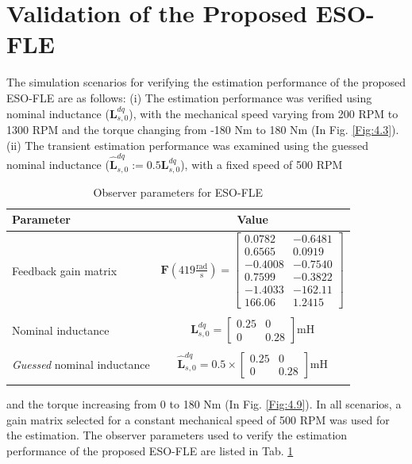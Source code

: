 \section{Validation of the Proposed ESO-FLE}
The simulation scenarios for verifying the estimation performance of the proposed ESO-FLE are as follows: (i) The estimation performance was verified using nominal inductance ($\mathbf{L}^{dq}_{s,0}$), with the mechanical speed varying from 200 RPM to 1300 RPM and the torque changing from -180 Nm to 180 Nm (In Fig. \ref{Fig:4.3}). (ii) The transient estimation performance was examined using the guessed nominal inductance ($\hat{\mathbf{L}}^{dq}_{s,0}:=0.5\mathbf{L}^{dq}_{s,0}$), with a fixed speed of 500 RPM \begin{table}[h]
\caption{Observer parameters for ESO-FLE}\label{Tab4.2}
\centering
\begin{tabular}{l c}
\hline
\textbf{Parameter} & \textbf{Value}  \\ \midrule
Feedback gain matrix & $\mathbf{F}(419\frac{\text{rad}}{\text{s}})=\begin{bmatrix}
    0.0782 & -0.6481\\
    0.6565 & 0.0919\\
    -0.4008 & -0.7540\\
    0.7599 & -0.3822\\
    -1.4033 & -162.11\\
    166.06 & 1.2415
\end{bmatrix}$\\
\\
Nominal inductance & $\mathbf{L}^{dq}_{s,0}=\begin{bmatrix}
    0.25 & 0\\
    0 & 0.28
\end{bmatrix}$mH\\
\\
\textit{Guessed} nominal inductance & $\hat{\mathbf{L}} ^{dq}_{s,0}= 0.5\times\begin{bmatrix}
    0.25 & 0\\
    0 & 0.28
\end{bmatrix}$mH\\
\\
\hline
\end{tabular}
\end{table}and the torque increasing from 0 to 180 Nm (In Fig. \ref{Fig:4.9}). In all scenarios, a gain matrix selected for a constant mechanical speed of 500 RPM was used for the estimation. The observer parameters used to verify the estimation performance of the proposed ESO-FLE are listed in Tab. \ref{Tab4.2} 

